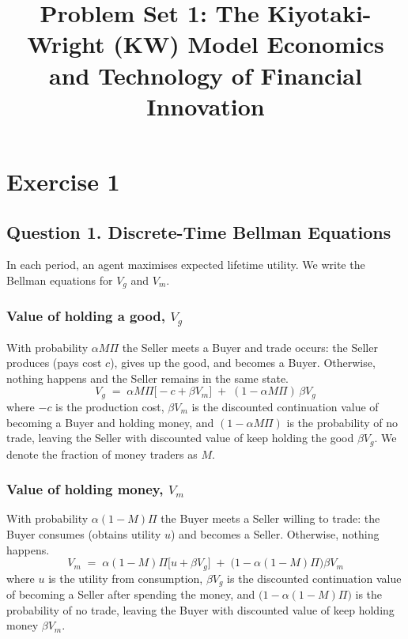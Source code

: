 \documentclass[11pt, a4paper]{article}
\title{
\textbf{Problem Set 1: The Kiyotaki-Wright (KW) Model}
\normalsize Economics and Technology of Financial Innovation
}
\author{}
\date{}
\begin{document}
\maketitle
\section*{Exercise 1}

\subsection*{Question 1. Discrete-Time Bellman Equations}

In each period, an agent maximises expected lifetime utility. We write the
Bellman equations for $V_g$ and $V_m$.

\subsubsection*{Value of holding a good, $V_g$}

With probability $\alpha M\Pi$ the Seller meets a Buyer and trade occurs:
the Seller produces (pays cost $c$), gives up the good, and becomes a Buyer.
Otherwise, nothing happens and the Seller remains in the same state.
\[
  V_g \;=\; \alpha M\Pi\bigl[-c + \beta V_m\bigr]
           \;+\; (1 - \alpha M\Pi)\,\beta V_g
\]
where $-c$ is the production cost, $\beta V_m$ is the discounted continuation
value of becoming a Buyer and holding money, and $(1-\alpha M\Pi)$ is the probability of no trade,
leaving the Seller with discounted value of keep holding the good $\beta V_g$. We denote the fraction of money traders as $M$.

\subsubsection*{Value of holding money, $V_m$}
With probability $\alpha(1-M)\Pi$ the Buyer meets a Seller willing to trade:
the Buyer consumes (obtains utility $u$) and becomes a Seller.
Otherwise, nothing happens.
\[
  V_m \;=\; \alpha(1- M)\Pi\bigl[u + \beta V_g\bigr]
           \;+\; \bigl(1 - \alpha(1- M)\Pi\bigr)\beta V_m
\]
where $u$ is the utility from consumption, $\beta V_g$ is the discounted continuation
value of becoming a Seller after spending the money, and $\bigl(1-\alpha(1- M)\Pi\bigr)$
is the probability of no trade, leaving the Buyer with discounted value of
keep holding money $\beta V_m$.



\end{document}
